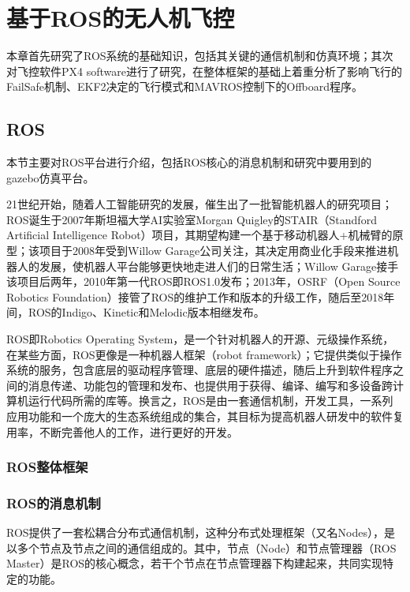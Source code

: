 \renewcommand{\baselinestretch}{1.5}
\fontsize{12pt}{13pt}\selectfont

\chapter{基于ROS的无人机飞控}\label{introduction}

本章首先研究了ROS系统的基础知识，包括其关键的通信机制和仿真环境；其次对飞控软件PX4 software进行了研究，在整体框架的基础上着重分析了影响飞行的FailSafe机制、EKF2决定的飞行模式和MAVROS控制下的Offboard程序。

\section{ROS}
本节主要对ROS平台进行介绍，包括ROS核心的消息机制和研究中要用到的gazebo仿真平台。

21世纪开始，随着人工智能研究的发展，催生出了一批智能机器人的研究项目；ROS诞生于2007年斯坦福大学AI实验室Morgan Quigley的STAIR（Standford Artificial Intelligence Robot）项目，其期望构建一个基于移动机器人+机械臂的原型；该项目于2008年受到Willow Garage公司关注，其决定用商业化手段来推进机器人的发展，使机器人平台能够更快地走进人们的日常生活；Willow Garage接手该项目后两年，2010年第一代ROS即ROS1.0发布；2013年，OSRF（Open Source Robotics Foundation）接管了ROS的维护工作和版本的升级工作，随后至2018年间，ROS的Indigo、Kinetic和Melodic版本相继发布。

ROS即Robotics Operating System，是一个针对机器人的开源、元级操作系统，在某些方面，ROS更像是一种机器人框架（robot framework）；它提供类似于操作系统的服务，包含底层的驱动程序管理、底层的硬件描述，随后上升到软件程序之间的消息传递、功能包的管理和发布、也提供用于获得、编译、编写和多设备跨计算机运行代码所需的库等。换言之，ROS是由一套通信机制，开发工具，一系列应用功能和一个庞大的生态系统组成的集合，其目标为提高机器人研发中的软件复用率，不断完善他人的工作，进行更好的开发。

\subsection{ROS整体框架}

\subsection{ROS的消息机制} \label{2.1.1}

ROS提供了一套松耦合分布式通信机制，这种分布式处理框架（又名Nodes），是以多个节点及节点之间的通信组成的。其中，节点（Node）和节点管理器（ROS Master）是ROS的核心概念，若干个节点在节点管理器下构建起来，共同实现特定的功能。

